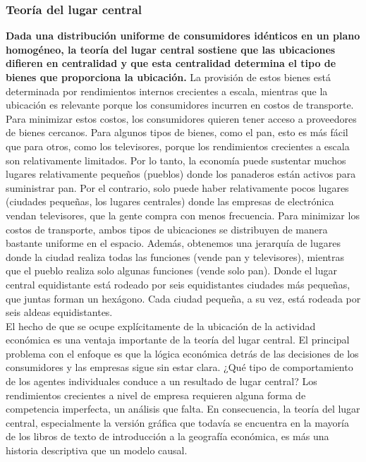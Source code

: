 \subsubsection{Teoría del lugar central}
\textbf{Dada una distribución uniforme de consumidores idénticos en un plano homogéneo, la teoría del lugar central sostiene que las ubicaciones difieren en centralidad y que esta centralidad determina el tipo de bienes que proporciona la ubicación.} La provisión de estos bienes está determinada por rendimientos internos crecientes a escala, mientras que la ubicación es relevante porque los consumidores incurren en costos de transporte. Para minimizar estos costos, los consumidores quieren tener acceso a proveedores de bienes cercanos. Para algunos tipos de bienes, como el pan, esto es más fácil que para otros, como los televisores, porque los rendimientos crecientes a escala son relativamente limitados. Por lo tanto, la economía puede sustentar muchos lugares relativamente pequeños (pueblos) donde los panaderos están activos para suministrar pan. Por el contrario, solo puede haber relativamente pocos lugares (ciudades pequeñas, los lugares centrales) donde las empresas de electrónica vendan televisores, que la gente compra con menos frecuencia. Para minimizar los costos de transporte, ambos tipos de ubicaciones se distribuyen de manera bastante uniforme en el espacio. Además, obtenemos una jerarquía de lugares donde la ciudad realiza todas las funciones (vende pan y televisores), mientras que el pueblo realiza solo algunas funciones (vende solo pan). Donde el lugar central equidistante está rodeado por seis equidistantes ciudades más pequeñas, que juntas forman un hexágono. Cada ciudad pequeña, a su vez, está rodeada por seis aldeas equidistantes.\\
El hecho de que se ocupe explícitamente de la ubicación de la actividad económica es una ventaja importante de la teoría del lugar central. El principal problema con el enfoque es que la lógica económica detrás de las decisiones de los consumidores y las empresas sigue sin estar clara. ¿Qué tipo de comportamiento de los agentes individuales conduce a un resultado de lugar central? Los rendimientos crecientes a nivel de empresa requieren alguna forma de competencia imperfecta, un análisis que falta. En consecuencia, la teoría del lugar central, especialmente la versión gráfica que todavía se encuentra en la mayoría de los libros de texto de introducción a la geografía económica, es más una historia descriptiva que un modelo causal.\\
